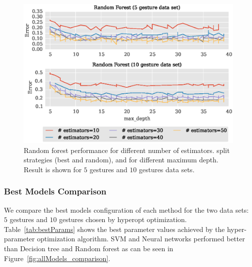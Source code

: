 \documentclass{article}
\begin{document}
\begin{figure}[t]
\vskip 0.2in
\begin{center}
\centerline{\includegraphics[width=\columnwidth]{randomForest_estimators.eps}}
\caption{Random forest performance for different number of estimators. split strategies (best and random), and for different maximum depth. Result is shown for $5$ gestures and $10$ gestures data sets.}
\label{fig:randomForest_estimators}
\end{center}
\vskip -0.2in
\end{figure}

\subsubsection{Best Models Comparison}

We compare the best models configuration of each method for the two data sets: $5$ gestures and $10$ gestures chosen by hyperopt optimization. Table~\ref{tab:bestParams} shows the best parameter values achieved by the hyper-parameter optimization algorithm. SVM and Neural networks performed better than Decision tree and Random forest as can be seen in Figure~\ref{fig:allModels_comparison}.
\end{document}
